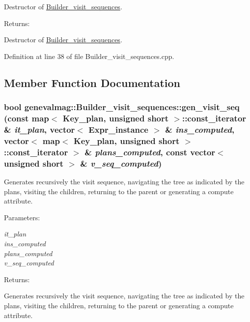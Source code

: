 Destructor of \hyperlink{classgenevalmag_1_1Builder__visit__sequences}{Builder\_\-visit\_\-sequences}. \begin{Desc}
\item[Returns:]\end{Desc}
Destructor of \hyperlink{classgenevalmag_1_1Builder__visit__sequences}{Builder\_\-visit\_\-sequences}. 

Definition at line 38 of file Builder\_\-visit\_\-sequences.cpp.

\subsection{Member Function Documentation}
\hypertarget{classgenevalmag_1_1Builder__visit__sequences_81498899f7859f929abb96526f20e4a3}{
\subsubsection[{gen\_\-visit\_\-seq}]{\setlength{\rightskip}{0pt plus 5cm}bool genevalmag::Builder\_\-visit\_\-sequences::gen\_\-visit\_\-seq (const map$<$ {\bf Key\_\-plan}, unsigned short $>$::const\_\-iterator \& {\em it\_\-plan}, \/  vector$<$ {\bf Expr\_\-instance} $>$ \& {\em ins\_\-computed}, \/  vector$<$ map$<$ {\bf Key\_\-plan}, unsigned short $>$::const\_\-iterator $>$ \& {\em plans\_\-computed}, \/  const vector$<$ unsigned short $>$ \& {\em v\_\-seq\_\-computed})}}
\label{classgenevalmag_1_1Builder__visit__sequences_81498899f7859f929abb96526f20e4a3}


Generates recursively the visit sequence, navigating the tree as indicated by the plans, visiting the children, returning to the parent or generating a compute attribute.

\begin{Desc}
\item[Parameters:]
\begin{description}
\item[{\em it\_\-plan}]\item[{\em ins\_\-computed}]\item[{\em plans\_\-computed}]\item[{\em v\_\-seq\_\-computed}]\end{description}
\end{Desc}
\begin{Desc}
\item[Returns:]\end{Desc}
Generates recursively the visit sequence, navigating the tree as indicated by the plans, visiting the children, returning to the parent or generating a compute attribute. 

